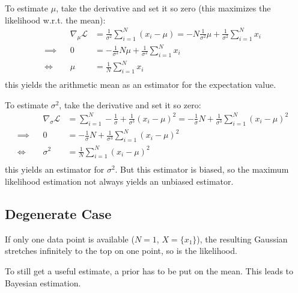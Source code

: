 			To estimate \(\mu\), take the derivative and set it so zero (this maximizes the likelihood w.r.t. the mean):
			\begin{align}
				         &  & \nabla_\mu \mathcal{L} & = \frac{1}{\sigma^2} \sum_{i = 1}^{N} (x_i - \mu) = -N\frac{1}{\sigma^2}\mu + \frac{1}{\sigma^2} \sum_{i = 1}^{N} x_i & \\
				\implies &  & 0                      & = -\frac{1}{\sigma^2}N\mu + \frac{1}{\sigma^2} \sum_{i = 1}^{N} x_i                                                   & \\
				\iff     &  & \mu                    & = \frac{1}{N} \sum_{i = 1}^{N} x_i                                                                                    & \\
			\end{align}
			this yields the arithmetic mean as an estimator for the expectation value.

			To estimate \(\sigma^2\), take the derivative and set it so zero:
			\begin{align}
				         &  & \nabla_{\sigma} \mathcal{L} & = \sum_{i = 1}^{N} -\frac{1}{\sigma} + \frac{1}{\sigma^3} (x_i - \mu)^2 = -\frac{1}{\sigma}N + \frac{1}{\sigma^3} \sum_{i = 1}^{N} (x_i - \mu)^2 & \\
				\implies &  & 0                           & = -\frac{1}{\sigma}N + \frac{1}{\sigma^3} \sum_{i = 1}^{N} (x_i - \mu)^2                                                                         & \\
				\iff     &  & \sigma^2                    & = \frac{1}{N} \sum_{i = 1}^{N} (x_i - \mu)^2                                                                                                     & \\
			\end{align}
			this yields an estimator for \(\sigma^2\). But this estimator is biased, so the maximum likelihood estimation not always yields an unbiased estimator.

	\subsection{Degenerate Case}
		If only one data point is available (\( N = 1 \), \( X = \{ x_1 \} \)), the resulting Gaussian stretches infinitely to the top on one point, so is the likelihood.

		To still get a useful estimate, a prior has to be put on the mean. This leads to Bayesian estimation.

